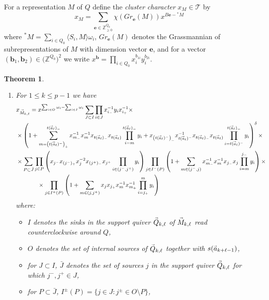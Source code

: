 \documentclass[12pt]{amsart}
\newcommand{\cT}{\mathcal{T}}
\newcommand{\ZZ}{\mathbb{Z}}
\newcommand{\bfb}{\mathbf{b}}
\newcommand{\bfe}{\mathbf{e}}
\renewcommand{\vec}[1]{\accentset{\shortrightarrow}{#1}}
\newtheorem{theorem}{Theorem}[section]
\numberwithin{equation}{section}
\begin{document}
  For a representation $M$ of $Q$ define the \emph{cluster character} $x_M\in\cT$ by
  \begin{equation}
    x_M=\sum_{\bfe\in\ZZ^{Q_0}_{\ge0}}\chi(Gr_\bfe(M))x^{B\bfe-{}^*M}
  \end{equation}
  where ${}^*M=\sum\limits_{i\in Q_0}\langle S_i,M\rangle\omega_i$, $Gr_\bfe(M)$ denotes the Grassmannian of subrepresentations of $M$ with dimension vector $\bfe$, and for a vector $(\bfb_1,\bfb_2)\in\big(\ZZ^{Q_0}\big)^2$ we write $x^\bfb=\prod_{i\in Q_0} x_i^{b_{1i}}y_i^{b_{2i}}$.
  \begin{theorem}\mbox{}
    \begin{enumerate}
      \item For $1\le k\le p-1$ we have
      \begin{align}
        &x_{\vec{M}_{k,\ell}}=x^{\sum_{i\in O}\omega_i-\sum_{i\in I}\omega_i}\sum_{J\subset I}\prod_{i\in J}x_{i_-}^{-1}y_ix_{i_+}^{-1}\times\\
        \nonumber&\times\left(1+\sum_{m=\left(t(\vec{a}_\ell)^-\right)_+}^{t(\vec{a}_\ell)_-}x_{m_-}^{-1}x_m^{-1}x_{t(\vec{a}_\ell)_-}x_{t(\vec{a}_\ell)}\prod_{i=m}^{t(\vec{a}_\ell)_-}y_i+x_{\left(t(\vec{a}_\ell)^-\right)_-}x_{t(\vec{a}_\ell)^-}^{-1}x_{t(\vec{a}_\ell)_-}x_{t(\vec{a}_\ell)}\prod_{i=t(\vec{a}_\ell)^-}^{t(\vec{a}_\ell)_-}y_i\right)^\delta\times\\
        \nonumber&\times\sum_{P\subset\bar{J}}\prod_{j\in P}\left(x_{j^-}x_{(j^-)_+}x_j^{-2}x_{(j^+)_-}x_{j^+}\prod_{i\in(j^-,j^+)}y_i\right)\prod_{j\in I^-(P)}\left(1+\sum_{m\in(j^-,j)}x_{m_-}^{-1}x_m^{-1}x_{j_-}x_j\prod_{i=m}^{j_-}y_i\right)\times\\
        \nonumber&\hspace{0.5in}\times\prod_{j\in I^+(P)}\left(1+\sum_{m\in(j,j^+)}x_jx_{j_+}x_m^{-1}x_{m_+}^{-1}\prod_{i=j_+}^m y_i\right)
      \end{align}
      where:
      \begin{itemize}
        \item $I$ denotes the sinks in the support quiver $\vec{Q}_{k,\ell}$ of $\vec{M}_{k,\ell}$ read counterclockwise around $Q$,
        \item $O$ denotes the set of internal sources of $\vec{Q}_{k,\ell}$ together with $s(\vec{a}_{k+\ell-1})$,
        \item for $J\subset I$, $\bar{J}$ denotes the set of sources $j$ in the support quiver $\vec{Q}_{k,\ell}$ for which $j^-,j^+\in J$,
        \item for $P\subset\bar{J}$, $I^\pm(P)=\{j\in J:j^\pm\in O\setminus P\}$,

\end{itemize}
\end{enumerate}
\end{theorem}
\end{document}

